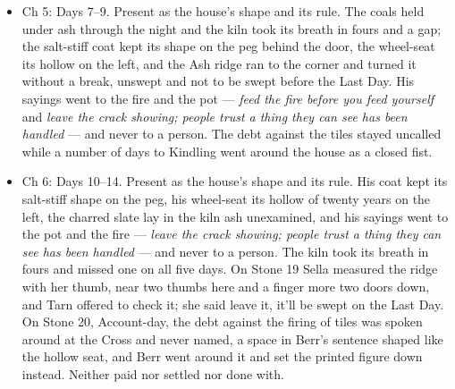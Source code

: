 \documentclass{design/chronicle}
\begin{document}
{\begin{itemize}[leftmargin=1.4em,itemsep=1pt,topsep=3pt,parsep=0pt]
\end{itemize}

\begin{itemize}[leftmargin=1.4em,itemsep=1pt,topsep=3pt,parsep=0pt]

\item Ch 5: Days 7--9. Present as the house’s shape and its rule. The coals held under ash through the night and the kiln took its breath in fours and a gap; the salt-stiff coat kept its shape on the peg behind the door, the wheel-seat its hollow on the left, and the Ash ridge ran to the corner and turned it without a break, unswept and not to be swept before the Last Day. His sayings went to the fire and the pot --- \emph{feed the fire before you feed yourself} and \emph{leave the crack showing; people trust a thing they can see has been handled} --- and never to a person. The debt against the tiles stayed uncalled while a number of days to Kindling went around the house as a closed fist.

\end{itemize}

\begin{itemize}[leftmargin=1.4em,itemsep=1pt,topsep=3pt,parsep=0pt]

\item Ch 6: Days 10--14. Present as the house’s shape and its rule. His coat kept its salt-stiff shape on the peg, his wheel-seat its hollow of twenty years on the left, the charred slate lay in the kiln ash unexamined, and his sayings went to the pot and the fire --- \emph{leave the crack showing; people trust a thing they can see has been handled} --- and never to a person. The kiln took its breath in fours and missed one on all five days. On Stone 19 Sella measured the ridge with her thumb, near two thumbs here and a finger more two doors down, and Tarn offered to check it; she said leave it, it’ll be swept on the Last Day. On Stone 20, Account-day, the debt against the firing of tiles was spoken around at the Cross and never named, a space in Berr’s sentence shaped like the hollow seat, and Berr went around it and set the printed figure down instead. Neither paid nor settled nor done with.

\end{itemize}

\begin{itemize}[leftmargin=1.4em,itemsep=1pt,topsep=3pt,parsep=0pt]


\end{itemize}}
\end{document}
